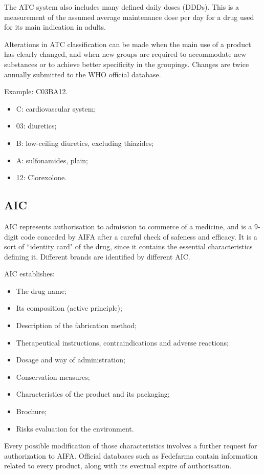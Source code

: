 The ATC system also includes many defined daily doses (DDDs). This is a measurement of the assumed average maintenance dose per day for a drug used for its main indication in adults.

Alterations in ATC classification can be made when the main use of a product has clearly changed, and when new groups are required to accommodate new substances or to achieve better specificity in the groupings. Changes are twice annually submitted to the WHO official database.

Example: C03BA12.
\begin{itemize}
	\item C: cardiovascular system;
		\item 03: diuretics;
			\item B: low-ceiling diuretics, excluding thiazides;
				\item A: sulfonamides, plain;
					\item 12: Clorexolone.
\end{itemize}


\subsection{AIC}
AIC represents authorisation to admission to commerce of a medicine, and is a 9-digit code conceded by AIFA after a careful check of safeness and efficacy. It is a sort of ``identity card" of the drug, since it contains the essential characteristics defining it\cite{aicdef}. Different brands are identified by different AIC.

AIC establishes:
\begin{itemize}
	\item The drug name;
	\item Its composition (active principle);
	\item Description of the fabrication method;
	\item Therapeutical instructions, contraindications and adverse reactions;
	\item Dosage and way of administration;
	 \item Conservation measures;
	 \item Characteristics of the product and its packaging;
	 \item Brochure;
	 \item Risks evaluation for the environment.
\end{itemize}

Every possible modification of those characteristics involves a further request for authorization to AIFA. Official databases such as Fedefarma contain information related to every product, along with its eventual expire of authorisation.

